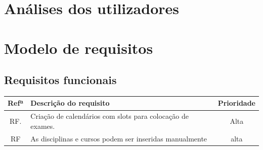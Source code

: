 \documentclass[11pt, twoside]{report}
\begin{document}
 	

	\chapter{Análises dos utilizadores}
	
	\chapter{Modelo de requisitos}
	\section{Requisitos funcionais}

	\pagebreak %
	\begin{center}
				\begin{tabularx}{\textwidth}{|c|X|c|}
				\hline
				\textbf{Refª }	& \textbf{Descrição do requisito} & \textbf{Prioridade} \\
				\hline
				RF. & Criação de calendários com slots para colocação de exames. & Alta \\
				\hline
				RF & As disciplinas e cursos podem ser inseridas manualmente & alta\\
				\hline
				

\end{tabularx}
\end{center}
\end{document}
